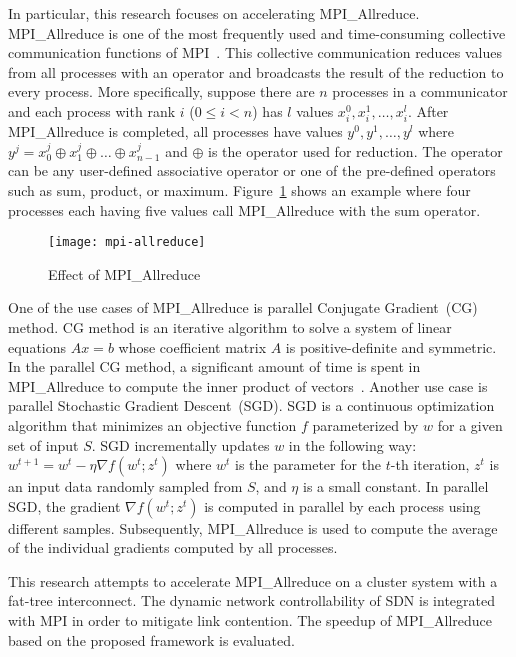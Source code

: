 In particular, this research focuses on accelerating MPI\_Allreduce.
MPI\_Allreduce is one of the most frequently used and time-consuming
collective communication functions of MPI\@~\cite{Chunduri2018}.
This collective communication reduces values from all
processes with an operator and broadcasts the result of the reduction to every
process. More specifically, suppose there are $n$ processes in a communicator
and each process with rank $i$ ($0 \leq i < n$) has $l$ values $x_i^0, x_i^1,
\dots, x_i^l$. After MPI\_Allreduce is completed, all processes have values
$y^0, y^1, \dots, y^l$ where $y^j = x_0^j \oplus x_1^j \oplus \dots \oplus
x_{n-1}^j$ and $\oplus$ is the operator used for reduction. The operator can
be any user-defined associative operator or one of the pre-defined operators
such as sum, product, or maximum. Figure~\ref{fig:mpi-allreduce} shows an
example where four processes each having five values call MPI\_Allreduce with
the sum operator.

\begin{figure}
    \centering
    \texttt{[image: mpi-allreduce]}
    \caption{Effect of MPI\_Allreduce}%
    \label{fig:mpi-allreduce}
\end{figure}

One of the use cases of MPI\_Allreduce is parallel Conjugate Gradient~(CG)
method. CG method is an iterative algorithm to solve a system of linear
equations $Ax = b$ whose coefficient matrix $A$ is positive-definite and
symmetric. In the parallel CG method, a significant amount of time is spent in
MPI\_Allreduce to compute the inner product of
vectors~\autocite{Kandalla2012}. Another use case is parallel Stochastic
Gradient Descent~(SGD). SGD is a continuous optimization algorithm that
minimizes an objective function $f$ parameterized by $w$ for a given set of
input $S$. SGD incrementally updates $w$ in the following way: $w^{t+1}=w^t-
\eta \nabla f(w^t; z^t)$ where $w^t$ is the parameter for the $t$-th
iteration, $z^t$ is an input data randomly sampled from $S$, and $\eta$ is a
small constant. In parallel SGD, the gradient $\nabla f(w^t; z^t)$ is computed
in parallel by each process using different samples. Subsequently,
MPI\_Allreduce is used to compute the average of the individual gradients
computed by all processes.

This research attempts to accelerate MPI\_Allreduce on a cluster system with a
fat-tree interconnect. The dynamic network controllability of SDN is
integrated with MPI in order to mitigate link contention. The speedup of
MPI\_Allreduce based on the proposed framework is evaluated.

